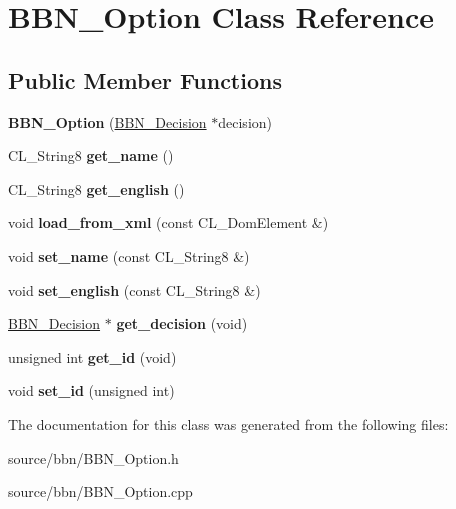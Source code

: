 \hypertarget{classBBN__Option}{
\section{BBN\_\-Option Class Reference}
\label{classBBN__Option}
}
\subsection*{Public Member Functions}
\begin{DoxyCompactItemize}
\item 
\hypertarget{classBBN__Option_a7d3c592f0e930a3730009ab76a133a58}{
{\bfseries BBN\_\-Option} (\hyperlink{classBBN__Decision}{BBN\_\-Decision} $\ast$decision)}
\label{classBBN__Option_a7d3c592f0e930a3730009ab76a133a58}

\item 
\hypertarget{classBBN__Option_ab20355fdd44b017727a004178be82519}{
CL\_\-String8 {\bfseries get\_\-name} ()}
\label{classBBN__Option_ab20355fdd44b017727a004178be82519}

\item 
\hypertarget{classBBN__Option_a1e07a43eeae60d00fdcdc92cd63b7f0d}{
CL\_\-String8 {\bfseries get\_\-english} ()}
\label{classBBN__Option_a1e07a43eeae60d00fdcdc92cd63b7f0d}

\item 
\hypertarget{classBBN__Option_a4d32641c550daa97502bd1be59e2f822}{
void {\bfseries load\_\-from\_\-xml} (const CL\_\-DomElement \&)}
\label{classBBN__Option_a4d32641c550daa97502bd1be59e2f822}

\item 
\hypertarget{classBBN__Option_a29aafd600bf0d8cdd5850475b9055266}{
void {\bfseries set\_\-name} (const CL\_\-String8 \&)}
\label{classBBN__Option_a29aafd600bf0d8cdd5850475b9055266}

\item 
\hypertarget{classBBN__Option_aafea47265bbadba2fd45c9f7b118c147}{
void {\bfseries set\_\-english} (const CL\_\-String8 \&)}
\label{classBBN__Option_aafea47265bbadba2fd45c9f7b118c147}

\item 
\hypertarget{classBBN__Option_a39e4b7ee59740fbeba7d868fd5af7c09}{
\hyperlink{classBBN__Decision}{BBN\_\-Decision} $\ast$ {\bfseries get\_\-decision} (void)}
\label{classBBN__Option_a39e4b7ee59740fbeba7d868fd5af7c09}

\item 
\hypertarget{classBBN__Option_adda8594719187ef052b8a82d36c97122}{
unsigned int {\bfseries get\_\-id} (void)}
\label{classBBN__Option_adda8594719187ef052b8a82d36c97122}

\item 
\hypertarget{classBBN__Option_a0462902d81e87603e070d3d8f41e67d1}{
void {\bfseries set\_\-id} (unsigned int)}
\label{classBBN__Option_a0462902d81e87603e070d3d8f41e67d1}

\end{DoxyCompactItemize}


The documentation for this class was generated from the following files:\begin{DoxyCompactItemize}
\item 
source/bbn/BBN\_\-Option.h\item 
source/bbn/BBN\_\-Option.cpp\end{DoxyCompactItemize}

